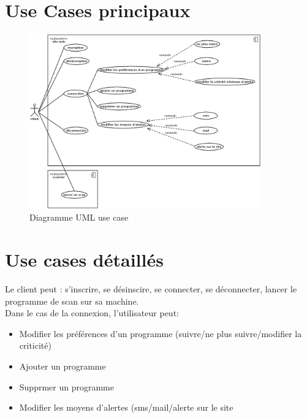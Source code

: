 \section{Use Cases principaux }

\begin{figure}[H]
  \caption{Diagramme UML use case}
  \centering
  \vspace*{0.5cm}
  \includegraphics[width=10cm]{usecase.png}
\end{figure}

\section{Use cases détaillés}
Le client peut : s'inscrire, se désinscire, se connecter, se déconnecter, lancer le programme de scan sur sa machine.\\
Dans le cas de la connexion, l'utilisateur peut:\\
\begin{itemize}
\item Modifier les préférences d'un programme (suivre/ne plus suivre/modifier la criticité)\\
\item Ajouter un programme\\
\item Supprmer un programme\\
\item Modifier les moyens d'alertes (sms/mail/alerte sur le site\\
\end{itemize}